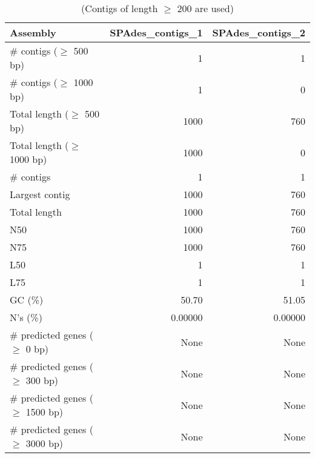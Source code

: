 \begin{table}[ht]
\begin{center}
\caption{(Contigs of length $\geq$ 200 are used)}
\begin{tabular}{|l*{2}{|r}|}
\hline
Assembly & SPAdes\_contigs\_1 & SPAdes\_contigs\_2 \\ \hline
\# contigs ($\geq$ 500 bp) & 1 & 1 \\ \hline
\# contigs ($\geq$ 1000 bp) & 1 & 0 \\ \hline
Total length ($\geq$ 500 bp) & 1000 & 760 \\ \hline
Total length ($\geq$ 1000 bp) & 1000 & 0 \\ \hline
\# contigs & 1 & 1 \\ \hline
Largest contig & 1000 & 760 \\ \hline
Total length & 1000 & 760 \\ \hline
N50 & 1000 & 760 \\ \hline
N75 & 1000 & 760 \\ \hline
L50 & 1 & 1 \\ \hline
L75 & 1 & 1 \\ \hline
GC (\%) & 50.70 & 51.05 \\ \hline
N's (\%) & 0.00000 & 0.00000 \\ \hline
\# predicted genes ($\geq$ 0 bp) & None & None \\ \hline
\# predicted genes ($\geq$ 300 bp) & None & None \\ \hline
\# predicted genes ($\geq$ 1500 bp) & None & None \\ \hline
\# predicted genes ($\geq$ 3000 bp) & None & None \\ \hline
\end{tabular}
\end{center}
\end{table}
